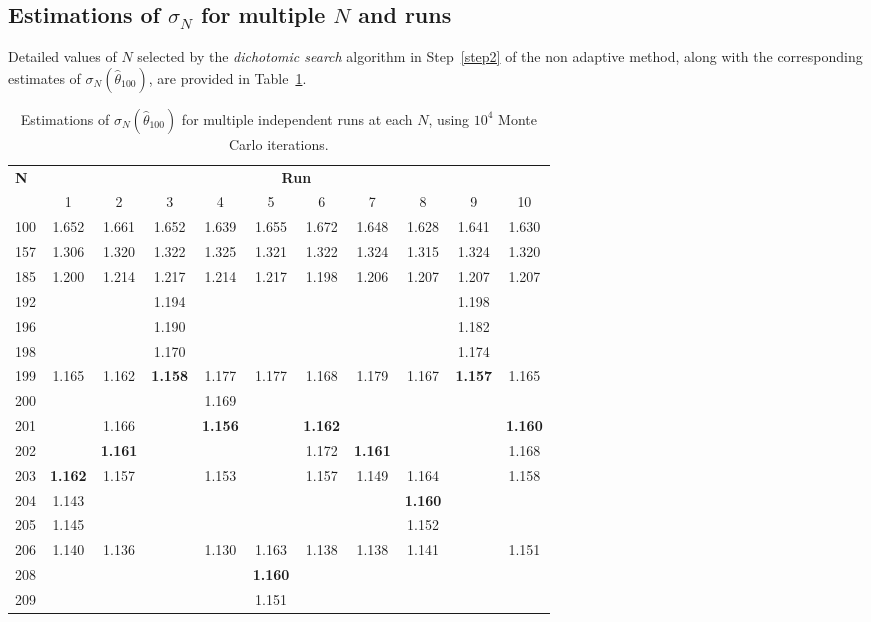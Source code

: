 \documentclass[pdflatex,sn-mathphys-num]{sn-jnl}
\theoremstyle{thmstyleone}
\theoremstyle{thmstyletwo}
\theoremstyle{thmstylethree}
\begin{document}
\subsection{Estimations of $\sigma_N$ for multiple $N$ and runs}
\label{appendixD3}
 Detailed values of \( N \) selected by the \textit{dichotomic search} algorithm in Step~\ref{step2} of the non adaptive method, along with the corresponding estimates of \( \sigma_N(\hat\theta_{100}) \), are provided in Table~\ref{comp:step2}.
\begin{table}[h]
\centering
\caption{Estimations of $\sigma_N(\hat \theta_{100})$ for multiple independent runs at each $N$, using $10^{4}$ Monte Carlo iterations.}
\label{comp:step2}
\begin{tabular}{@{}l*{10}{c}@{}}
\toprule
\textbf{N} & \multicolumn{10}{c}{\textbf{Run}} \\
\cmidrule(lr){2-11}
 & 1 & 2 & 3 & 4 & 5 & 6 & 7 & 8 & 9 & 10 \\
\hline
100 & 1.652 & 1.661 & 1.652 & 1.639 & 1.655 & 1.672 & 1.648 & 1.628 & 1.641 & 1.630 \\
157 & 1.306 & 1.320 & 1.322 & 1.325 & 1.321 & 1.322 & 1.324 & 1.315 & 1.324 & 1.320 \\
185 & 1.200 & 1.214 & 1.217 & 1.214 & 1.217 & 1.198 & 1.206 & 1.207 & 1.207 & 1.207 \\
192 & & & 1.194 & & & & & & 1.198 & \\
196 & & & 1.190 & & & & & & 1.182 & \\
198 & & & 1.170 & & & & & & 1.174 & \\
199 & 1.165 & 1.162 & \textbf{1.158} & 1.177 & 1.177 & 1.168 & 1.179 & 1.167 & \textbf{1.157} & 1.165 \\
200 & & & & 1.169 & & & & & & \\
201 & & 1.166 & & \textbf{1.156} & & \textbf{1.162} & & & & \textbf{1.160} \\
202 & & \textbf{1.161} & & & & 1.172 & \textbf{1.161} & & & 1.168 \\
203 & \textbf{1.162} & 1.157 & & 1.153 & & 1.157 & 1.149 & 1.164 & & 1.158 \\
204 & 1.143 & & & & & & & \textbf{1.160} & & \\
205 & 1.145 & & & & & & & 1.152 & & \\
206 & 1.140 & 1.136 & & 1.130 & 1.163 & 1.138 & 1.138 & 1.141 & & 1.151 \\
208 & & & & & \textbf{1.160} & & & & & \\
209 & & & & & 1.151 & & & & & \\

\end{tabular}
\end{table}
\end{document}
